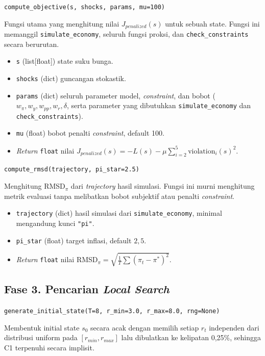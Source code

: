 \texttt{compute\_objective(s, shocks, params, mu=100)}

Fungsi utama yang menghitung nilai $J_{penalized}(s)$ untuk sebuah state. Fungsi ini memanggil \texttt{simulate\_economy}, seluruh fungsi proksi, dan \texttt{check\_constraints} secara berurutan.

\begin{itemize}
    \item \texttt{s} (list[float]) state suku bunga.
    \item \texttt{shocks} (dict) guncangan stokastik.
    \item \texttt{params} (dict) seluruh parameter model, \textit{constraint}, dan bobot ($w_\pi, w_y, w_{pp}, w_r, \delta$, serta parameter yang dibutuhkan \texttt{simulate\_economy} dan \texttt{check\_constraints}).
    \item \texttt{mu} (float) bobot penalti \textit{constraint}, default 100.
    \item \textit{Return} \texttt{float} nilai $J_{penalized}(s) = -L(s) - \mu \sum_{i=2}^{5} \text{violation}_i(s)^2$.
\end{itemize}

\texttt{compute\_rmsd(trajectory, pi\_star=2.5)}

Menghitung RMSD$_{\pi}$ dari \textit{trajectory} hasil simulasi. Fungsi ini murni menghitung metrik evaluasi tanpa melibatkan bobot subjektif atau penalti \textit{constraint}.

\begin{itemize}
    \item \texttt{trajectory} (dict) hasil simulasi dari \texttt{simulate\_economy}, minimal mengandung kunci \texttt{"pi"}.
    \item \texttt{pi\_star} (float) target inflasi, default $2{,}5$.
    \item \textit{Return} \texttt{float} nilai RMSD$_{\pi} = \sqrt{\frac{1}{T} \sum (\pi_t - \pi^{*})^{2}}$.
\end{itemize}

\subsection*{Fase 3. Pencarian \textit{Local Search}}

\texttt{generate\_initial\_state(T=8, r\_min=3.0, r\_max=8.0, rng=None)}

Membentuk initial state $s_0$ secara acak dengan memilih setiap $r_t$ independen dari distribusi uniform pada $[r_{min}, r_{max}]$ lalu dibulatkan ke kelipatan 0,25\%, sehingga C1 terpenuhi secara implisit.

